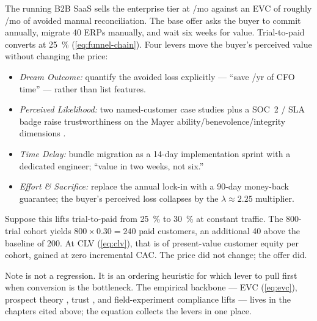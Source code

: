 \begin{example}
The running B2B SaaS sells the enterprise tier at /mo against an EVC of roughly /mo of avoided manual reconciliation. The base offer asks the buyer to commit annually, migrate 40 ERPs manually, and wait six weeks for value. Trial-to-paid converts at \qty{25}{\percent} (\cref{eq:funnel-chain}). Four levers move the buyer's perceived value without changing the price:

\begin{itemize}
  \item \emph{Dream Outcome:} quantify the avoided loss explicitly --- ``save /yr of CFO time'' --- rather than list features.
  \item \emph{Perceived Likelihood:} two named-customer case studies \parencite{goldstein2008field} plus a SOC~2 / SLA badge raise trustworthiness on the Mayer ability/benevolence/integrity dimensions \parencite{mayer1995model}.
  \item \emph{Time Delay:} bundle migration as a 14-day implementation sprint with a dedicated engineer; ``value in two weeks, not six.''
  \item \emph{Effort \& Sacrifice:} replace the annual lock-in with a \num{90}-day money-back guarantee; the buyer's perceived loss collapses by the $\lambda \approx 2.25$ multiplier.
\end{itemize}

Suppose this lifts trial-to-paid from \qty{25}{\percent} to \qty{30}{\percent} at constant traffic. The 800-trial cohort yields $800 \times 0.30 = 240$ paid customers, an additional \num{40} above the baseline of \num{200}. At CLV  (\cref{eq:clv}), that is  of present-value customer equity per cohort, gained at zero incremental CAC. The price did not change; the offer did.
\end{example}

\begin{admonition}{Note}
 is not a regression. It is an ordering heuristic for which lever to pull first when conversion is the bottleneck. The empirical backbone --- EVC (\cref{eq:evc}), prospect theory \parencite{tversky1992cumulative}, trust \parencite{mayer1995model,colquitt2007meta}, and field-experiment compliance lifts \parencite{goldstein2008field} --- lives in the chapters cited above; the equation collects the levers in one place.
\end{admonition}
